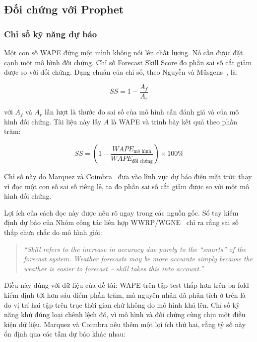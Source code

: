 \documentclass[12pt, a4paper]{report}
\begin{document}
\FloatBarrier
\subsection{Đối chứng với Prophet}

\subsubsection{Chỉ số kỹ năng dự báo}

Một con số WAPE đứng một mình không nói lên chất lượng. Nó cần được đặt cạnh một mô hình đối
chứng. Chỉ số Forecast Skill Score đo phần sai số cắt giảm được so với đối chứng. Dạng chuẩn của
chỉ số, theo Nguyễn và Müsgens~\cite{nguyen2026meta}, là:

\begin{equation}
\label{eq:ss_tong_quat}
SS = 1 - \frac{A_f}{A_r}
\end{equation}

với $A_f$ và $A_r$ lần lượt là thước đo sai số của mô hình cần đánh giá và của mô hình đối
chứng. Tài liệu này lấy $A$ là WAPE và trình bày kết quả theo phần trăm:

\begin{equation}
\label{eq:ss_wape}
SS = \left(1 - \frac{WAPE_{\text{mô hình}}}{WAPE_{\text{đối chứng}}}\right) \times 100\%
\end{equation}

Chỉ số này do Marquez và Coimbra~\cite{marquez2013skill} đưa vào lĩnh vực dự báo điện mặt trời:
thay vì đọc một con số sai số riêng lẻ, ta đo phần sai số cắt giảm được so với một mô hình đối
chứng.

Lợi ích của cách đọc này được nêu rõ ngay trong các nguồn gốc. Sổ tay kiểm định dự báo của Nhóm công
tác liên hợp WWRP/WGNE~\cite{wwrp2009verif} chỉ ra rằng sai số thấp chưa chắc do mô hình giỏi:

\begin{quote}\small
\textit{``Skill refers to the increase in accuracy due purely to the ``smarts'' of the forecast
system. Weather forecasts may be more accurate simply because the weather is easier to forecast
-- skill takes this into account.''}
\end{quote}

Điều này đúng với dữ liệu của đề tài: WAPE trên tập test thấp hơn trên ba fold kiểm định tới hơn
sáu điểm phần trăm, mà nguyên nhân đã phân tích ở trên là do vị trí hai tập trên trục thời gian
chứ không do mô hình khá lên. Chỉ số kỹ năng khử đúng loại chênh lệch đó, vì mô hình và đối
chứng cùng chịu một điều kiện dữ liệu. Marquez và Coimbra nêu thêm một lợi ích thứ hai, rằng tỷ
số này ổn định qua các tầm dự báo khác nhau:
\end{document}
